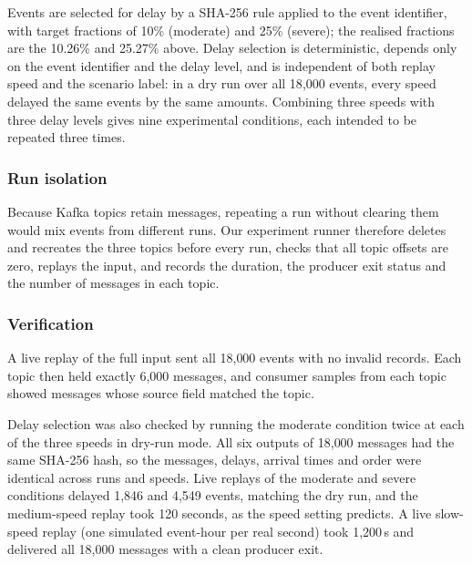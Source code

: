 Events are selected for delay by a SHA-256 rule applied to the event identifier, with target fractions of 10\% (moderate) and 25\% (severe); the realised fractions are the 10.26\% and 25.27\% above. Delay selection is deterministic, depends only on the event identifier and the delay level, and is independent of both replay speed and the
scenario label: in a dry run over all 18{,}000 events, every speed delayed the
same events by the same amounts. Combining three speeds with three delay levels
gives nine experimental conditions, each intended to be repeated three times.

\subsubsection{Run isolation}
Because Kafka topics retain messages, repeating a run without clearing them would
mix events from different runs. Our experiment runner therefore deletes and
recreates the three topics before every run, checks that all topic offsets are
zero, replays the input, and records the duration, the producer exit status and
the number of messages in each topic.

\subsubsection{Verification}
A live replay of the full input sent all 18{,}000 events with no invalid records.
Each topic then held exactly 6{,}000 messages, and consumer samples from each
topic showed messages whose source field matched the topic.

Delay selection was also checked by running the moderate condition twice at each of the three speeds in dry-run mode. All six outputs of 18{,}000 messages had the same SHA-256 hash, so the messages, delays, arrival times and order were identical across runs and speeds. Live replays of the moderate and severe conditions delayed 1{,}846 and 4{,}549 events, matching the dry run, and the medium-speed replay took 120 seconds, as the speed setting predicts. A live slow-speed replay (one simulated event-hour per real second) took 1{,}200\,s and delivered all 18{,}000 messages with a clean producer exit.

